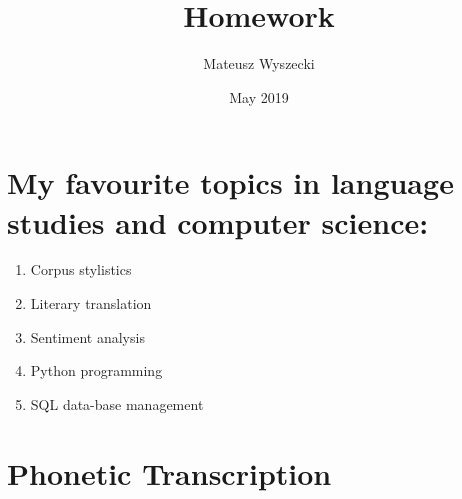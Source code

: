 \documentclass{article}
\title{Homework}
\author{Mateusz Wyszecki}
\date{May 2019}
\begin{document}
\maketitle
\newline




\section{My favourite topics in language studies and computer science:}

\begin{enumerate}
  \item Corpus stylistics
  \item Literary translation
  \item Sentiment analysis 
  \item Python programming
  \item SQL data-base management 
\end{enumerate}

\section{Phonetic Transcription}
\newline
\end{document}
